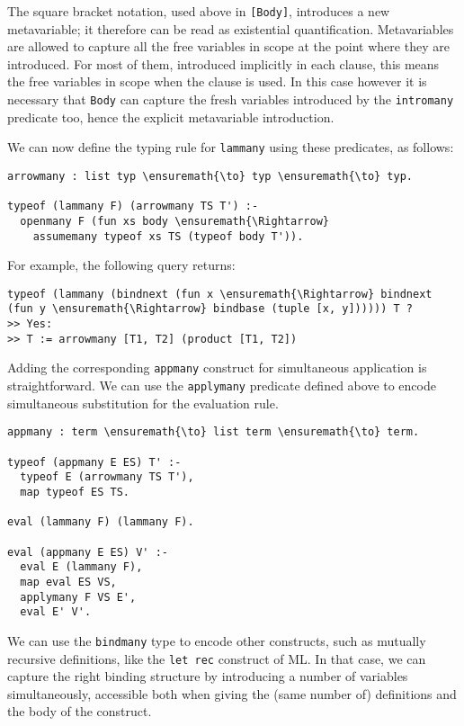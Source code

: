 The square bracket notation, used above in \texttt{{[}Body{]}},
introduces a new metavariable; it therefore can be read as existential
quantification. Metavariables are allowed to capture all the free
variables in scope at the point where they are introduced. For most of
them, introduced implicitly in each clause, this means the free
variables in scope when the clause is used. In this case however it is
necessary that \texttt{Body} can capture the fresh variables introduced
by the \texttt{intromany} predicate too, hence the explicit metavariable
introduction.

We can now define the typing rule for \texttt{lammany} using these
predicates, as follows:

\begin{verbatim}
arrowmany : list typ \ensuremath{\to} typ \ensuremath{\to} typ.

typeof (lammany F) (arrowmany TS T') :-
  openmany F (fun xs body \ensuremath{\Rightarrow}
    assumemany typeof xs TS (typeof body T')).
\end{verbatim}

For example, the following query returns:

\begin{verbatim}
typeof (lammany (bindnext (fun x \ensuremath{\Rightarrow} bindnext (fun y \ensuremath{\Rightarrow} bindbase (tuple [x, y]))))) T ?
>> Yes:
>> T := arrowmany [T1, T2] (product [T1, T2])
\end{verbatim}

Adding the corresponding \texttt{appmany} construct for simultaneous
application is straightforward. We can use the \texttt{applymany}
predicate defined above to encode simultaneous substitution for the
evaluation rule.

\begin{verbatim}
appmany : term \ensuremath{\to} list term \ensuremath{\to} term.

typeof (appmany E ES) T' :-
  typeof E (arrowmany TS T'),
  map typeof ES TS.

eval (lammany F) (lammany F).

eval (appmany E ES) V' :-
  eval E (lammany F),
  map eval ES VS,
  applymany F VS E',
  eval E' V'.
\end{verbatim}

We can use the \texttt{bindmany} type to encode other constructs, such
as mutually recursive definitions, like the \texttt{let\ rec} construct
of ML. In that case, we can capture the right binding structure by
introducing a number of variables simultaneously, accessible both when
giving the (same number of) definitions and the body of the construct.

